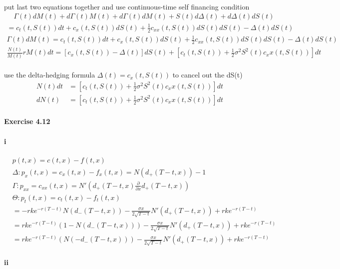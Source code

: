 \documentclass{article}
\begin{document}
\paragraph{}{put last two equations together and use continuous-time self financing condition}
\begin{align*}
  \quad \Gamma(t)dM(t)+d\Gamma(t)M(t)+d\Gamma(t)dM(t)+S(t)d\Delta(t)+d\Delta(t)dS(t) \\
  = c_t(t,S(t))dt+c_x(t,S(t))dS(t)+\frac{1}{2}c_{xx}(t,S(t))dS(t)dS(t)-\Delta(t)dS(t)\\
  \Gamma(t)dM(t)  =c_t(t,S(t))dt+c_x(t,S(t))dS(t)+\frac{1}{2}c_{xx}(t,S(t))dS(t)dS(t)-\Delta(t)dS(t)\\
  \frac{N(t)}{M(t)}rM(t)dt=[c_x(t,S(t))-\Delta(t)]dS(t)+[c_t(t,S(t))+\frac{1}{2}\sigma^2S^2(t)c_xx(t,S(t))]dt
\end{align*}
\paragraph{}{use the delta-hedging formula $\Delta(t)=c_x(t,S(t))$ to cancel out the dS(t)}
\begin{align*}
  N(t)dt & =[c_t(t,S(t))+\frac{1}{2}\sigma^2S^2(t)c_xx(t,S(t))]dt\\
  dN(t) & =[c_t(t,S(t))+\frac{1}{2}\sigma^2S^2(t)c_xx(t,S(t))]dt
\end{align*}
\paragraph{Exercise 4.12}
\paragraph{i}
\begin{align*}
  &p(t,x)=c(t,x)-f(t,x) \\
  &\Delta: p_x(t,x)=c_x(t,x)-f_x(t,x)=N(d_+(T-t,x))-1 \\
 & \Gamma: p_{xx}=c_{xx}(t,x)=N'(d_+(T-t,x)\frac{\partial}{\partial x}d_+(T-t,x)) \\
  &\Theta: p_t(t,x)=c_t(t,x)-f_t(t,x) \\
 & =-rke^{-r(T-t)}N(d_-(T-t,x))-\frac{\sigma x}{2\sqrt{T-t}}N'(d_+(T-t,x))+rke^{-r(T-t)}\\
  &=rke^{-r(T-t)}(1-N(d_-(T-t,x)))-\frac{\sigma x}{2\sqrt{T-t}}N'(d_+(T-t,x))+rke^{-r(T-t)}\\
  &=rke^{-r(T-t)}(N(-d_-(T-t,x)))-\frac{\sigma x}{2\sqrt{T-t}}N'(d_+(T-t,x))+rke^{-r(T-t)}
\end{align*}
\paragraph{ii}
\end{document}
